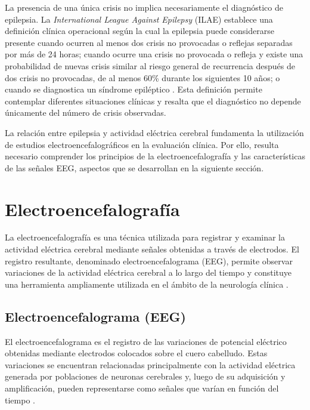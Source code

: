 La presencia de una única crisis no implica necesariamente el diagnóstico de
epilepsia. La \textit{International League Against Epilepsy} (ILAE) establece una
definición clínica operacional según la cual la epilepsia puede considerarse
presente cuando ocurren al menos dos crisis no provocadas o reflejas separadas
por más de 24 horas; cuando ocurre una crisis no provocada o refleja y existe
una probabilidad de nuevas crisis similar al riesgo general de recurrencia
después de dos crisis no provocadas, de al menos 60\% durante los siguientes
10 años; o cuando se diagnostica un síndrome epiléptico
\citep{Fisher2014EpilepsyDefinition}. Esta definición permite contemplar
diferentes situaciones clínicas y resalta que el diagnóstico no depende
únicamente del número de crisis observadas.

La relación entre epilepsia y actividad eléctrica cerebral fundamenta
la utilización de estudios electroencefalográficos en la evaluación clínica.
Por ello, resulta necesario comprender los principios de la
electroencefalografía y las características de las señales EEG, aspectos
que se desarrollan en la siguiente sección.

\section{Electroencefalografía}
\label{sec:electroencefalografia}

La electroencefalografía es una técnica utilizada para registrar y examinar
la actividad eléctrica cerebral mediante señales obtenidas a través de
electrodos. El registro resultante, denominado electroencefalograma (EEG),
permite observar variaciones de la actividad eléctrica cerebral a lo largo
del tiempo y constituye una herramienta ampliamente utilizada en el ámbito
de la neurología clínica \citep{StLouisFrey2016EEG}.

\subsection{Electroencefalograma (EEG)}
\label{subsec:electroencefalograma}

El electroencefalograma es el registro de las variaciones de potencial
eléctrico obtenidas mediante electrodos colocados sobre el cuero cabelludo.
Estas variaciones se encuentran relacionadas principalmente con la actividad
eléctrica generada por poblaciones de neuronas cerebrales y, luego de su
adquisición y amplificación, pueden representarse como señales que varían en
función del tiempo \citep{StLouisFrey2016EEG}.

